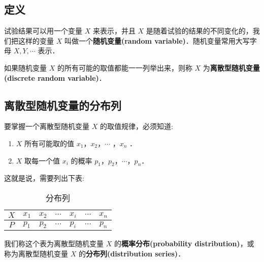 
\subsection{定义}
试验结果可以用一个变量 $X$ 来表示，并且 $X$ 是随着试验的结果的不同变化的，我们把这样的变量 $X$ 叫做一个\textbf{随机变量(random variable)}．随机变量常用大写字母 $X,Y,\cdots$ 表示．

如果随机变量  $X$ 的所有可能的取值都能一一列举出来，则称 $X$ 为\textbf{离散型随机变量(discrete random variable)}．

\subsection{离散型随机变量的分布列}
要掌握一个离散型随机变量 $X$ 的取值规律，必须知道:
\begin{enumerate}
\item $X$ 所有可能取的值 $x_1$，$x_2$，$\cdots$ ，$x_n$ ．
\item $X$ 取每一个值 $x_i$ 的概率 $p_1$，$p_2$，$\cdots$，$p_n$．
\end{enumerate}
这就是说，需要列出下表:

\begin{table}[h]
\centering
\caption{分布列}\label{HsDRV_tab1}
\begin{tabular}{|c|c|c|c|c|c|c|}
\hline
$X$ & $x_1$ & $x_2$ & $\cdots$ & $x_i$ & $\cdots$ & $x_n$ \\
\hline
$P$ & $p_1$ & $p_2$ & $\cdots$ & $p_i$ & $\cdots$ & $p_n$ \\
\hline
\end{tabular}
\end{table}
我们称这个表为离散型随机变量 $X$ 的\textbf{概率分布(probability distribution)}，或称为离散型随机变量 $X$ 的\textbf{分布列(distribution series)}．
